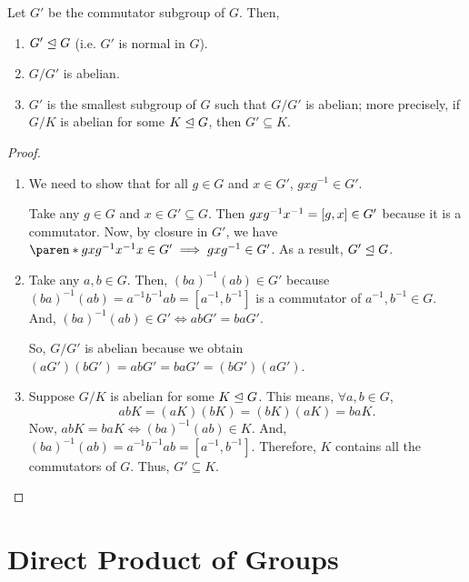 \documentclass[11pt]{penrose}
\begin{document}
\begin{nthm}
    Let $G'$ be the commutator subgroup of $G$. Then,
    \begin{enumerate}
        \item $G' \mathrel{\trianglelefteq} G$ (i.e. $G'$ is normal in $G$).
        \item $G / G'$ is abelian.
        \item $G'$ is the smallest subgroup of $G$ such that $G/G'$ is abelian; more precisely, if $G / K$ is abelian for some $K \mathrel{\trianglelefteq} G$, then $G' \subseteq K$.
    \end{enumerate}
\end{nthm}
\begin{proof}
    \phantom{}
    \begin{enumerate}
        \item We need to show that for all $g \in G$ and $x \in G'$, $g x g^{-1} \in G'$.

        Take any $g \in G$ and $x \in G' \subseteq G$. Then $g x g^{-1} x^{-1} = \lbrack g, x\rbrack \in G'$ because it is a commutator. Now, by closure in $G'$, we have
        $\paren*{ g x g^{-1} x^{-1} } x \in G' \implies g x g^{-1} \in G'$. As a result, $G' \mathrel{\trianglelefteq} G$.

        \item Take any $a, b \in G$. Then, $(ba)^{-1} (ab) \in G'$ because $(ba)^{-1} (ab) = a^{-1} b^{-1} a b = [a^{-1}, b^{-1}]$ is a commutator of $a^{-1}, b^{-1} \in G$. And, $(ba)^{-1} (ab) \in G' \iff ab G' = ba G'$.

        So, $G/G'$ is abelian because we obtain $(aG')(bG') = ab G' = ba G' = (bG')(aG')$.

        \item Suppose $G/K$ is abelian for some $K \mathrel{\trianglelefteq} G$. This means, $\forall a,b \in G$,
        \begin{equation*}
            abK = (aK)(bK) = (bK)(aK) = baK.
        \end{equation*}
        Now, $abK = baK \iff (ba)^{-1}(ab) \in K$. And, $(ba)^{-1} (ab) = a^{-1} b^{-1} a b = [a^{-1}, b^{-1}]$. Therefore, $K$ contains all the commutators of $G$. Thus, $G' \subseteq K$.
        \qedhere
    \end{enumerate}
\end{proof}

\section{Direct Product of Groups}
\end{document}
